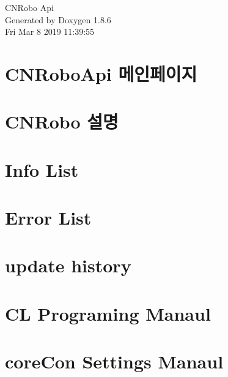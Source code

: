 \documentclass[twoside]{book}
\newcommand{\clearemptydoublepage}{%
  \newpage{\pagestyle{empty}\cleardoublepage}%
}
\begin{document}
\hypersetup{pageanchor=false}
\begin{titlepage}
\vspace*{7cm}
\begin{center}%
{\Large C\-N\-Robo Api }\\
\vspace*{1cm}
{\large Generated by Doxygen 1.8.6}\\
\vspace*{0.5cm}
{\small Fri Mar 8 2019 11:39:55}\\
\end{center}
\end{titlepage}
\clearemptydoublepage
\tableofcontents
\clearemptydoublepage
{}
\hypersetup{pageanchor=true}

\chapter{C\-N\-Robo\-Api 메인페이지}
\label{index}\hypertarget{index}{}
\chapter{C\-N\-Robo 설명}
\label{md_CNRoboDoc}
\hypertarget{md_CNRoboDoc}{}

\chapter{Info List}
\label{Info_List}
\hypertarget{Info_List}{}

\chapter{Error List}
\label{Error_List}
\hypertarget{Error_List}{}

\chapter{update history}
\label{update_history}
\hypertarget{update_history}{}

\chapter{C\-L Programing Manaul}
\label{md__home_kimdj_project_coreDoc_doc_cl_program}
\hypertarget{md__home_kimdj_project_coreDoc_doc_cl_program}{}

\chapter{core\-Con Settings Manaul}
\label{md__home_kimdj_project_coreDoc_doc_corecon_settings}
\hypertarget{md__home_kimdj_project_coreDoc_doc_corecon_settings}{}

\end{document}

